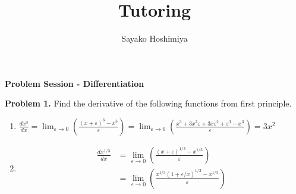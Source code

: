 \documentclass[10pt]{article}
\title{Tutoring}
\author{Sayako Hoshimiya}
\begin{document}
\def \setminus {\mathbin{\backslash}}
\begin{center}
\textbf{\Large Problem Session - Differentiation}
\end{center}

\textbf{Problem 1.} Find the derivative of the following functions from first principle.
\begin{enumerate}[label=\alph*.]
\item $\displaystyle\frac{d x^{3}}{d x}=\lim _{\varepsilon \rightarrow 0}\left(\frac{(x+\varepsilon)^{3}-x^{3}}{\varepsilon}\right)=\lim _{\varepsilon \rightarrow 0}\left(\frac{x^{3}+3 x^{2} \varepsilon+3 x \varepsilon^{2}+\varepsilon^{3}-x^{3}}{\varepsilon}\right)=3 x^{2}$
\item $$\begin{aligned} \frac{d x^{1 / 3}}{d x} &=\lim _{\varepsilon \rightarrow 0}\left(\frac{(x+\varepsilon)^{1 / 3}-x^{1 / 3}}{\varepsilon}\right) \\ &=\lim _{\varepsilon \rightarrow 0}\left(\frac{x^{1 / 3}(1+\varepsilon / x)^{1 / 3}-x^{1 / 3}}{\varepsilon}\right) \\
\end{aligned}$$


\end{enumerate}
\end{document}
